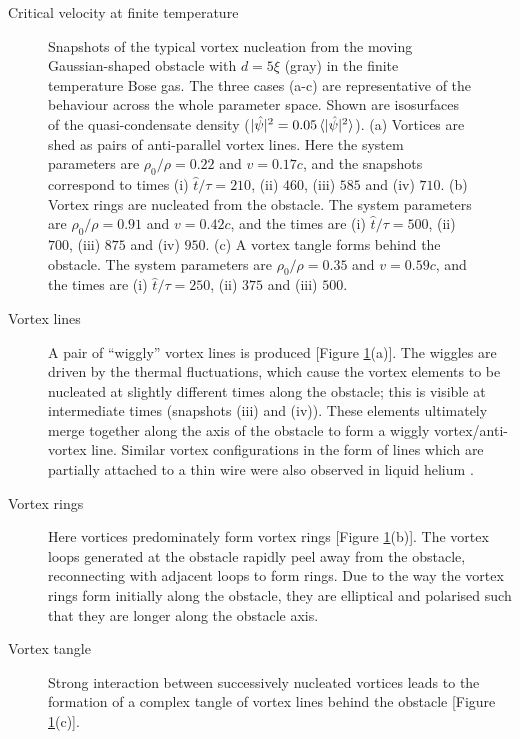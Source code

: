 \begin{chapter}{\label{cha:nonequib}Critical velocity at finite temperature}
\begin{figure}
    \caption{\label{fig:vort-lines} Snapshots of the typical vortex nucleation from the moving Gaussian-shaped obstacle with $d=5\xi$ (gray) in the finite temperature Bose gas. The three cases (a-c) are representative of the behaviour across the whole parameter space. Shown are  isosurfaces of the quasi-condensate density ($|\hat{\psi}|^2 = 0.05\braket{|\hat{\psi}|^2}$).  (a) Vortices are shed as pairs of anti-parallel vortex lines.  Here the system parameters are $\rho_0/\rho = 0.22$ and $v=0.17c$, and the snapshots correspond to times (i) $\hat{t}/\tau=210$, (ii) $460$, (iii) $585$ and (iv) $710$.  (b) Vortex rings are nucleated from the obstacle.  The system parameters are $\rho_0/\rho = 0.91$ and $v=0.42c$, and the times are (i) $\hat{t}/\tau=500$, (ii) $700$, (iii) $875$ and (iv) $950$. (c) A vortex tangle forms behind the obstacle. The system parameters are $\rho_0/\rho = 0.35$ and $v=0.59c$, and the times are (i) $\hat{t}/\tau=250$, (ii) $375$ and (iii) $500$. }
\end{figure}


\begin{description}
\item[Vortex lines] A pair of ``wiggly'' vortex lines is produced  [Figure  \ref{fig:vort-lines}(a)].  The wiggles are driven by the thermal fluctuations, which cause the vortex elements to be nucleated at slightly different times along the obstacle; this is visible at intermediate times (snapshots (iii) and (iv)).   These elements ultimately merge together along the axis of the obstacle to form a wiggly vortex/anti-vortex line. Similar vortex configurations
in the form of lines which are partially attached to a thin wire 
were also observed in liquid helium \cite{zieve2001}. 
\item[Vortex rings]  Here vortices predominately form vortex
rings [Figure \ref{fig:vort-lines}(b)].  The vortex loops generated
at the obstacle rapidly peel away from the obstacle, reconnecting with
adjacent loops to form rings. Due to the way the vortex rings form initially along the obstacle, they are elliptical and polarised such that they are longer along the obstacle axis. 
\item[Vortex tangle]  Strong
interaction between successively nucleated vortices leads to the formation of a complex tangle of vortex lines behind the obstacle [Figure \ref{fig:vort-lines}(c)].
\end{description}


\end{chapter}
